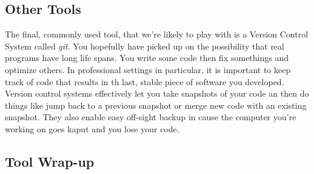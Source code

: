 \documentclass[]{tufte-handout}
\begin{document}
\subsection{Other Tools}

The final, commonly used tool, that we're likely to play with is a Version Control System called \textit{git}. You hopefully have picked up on the possibility that real programs have long life spans.  You write some code then fix somethings and optimize others.  In professional settings in particular, it is important to keep track of code that results in th last, stable piece of software you developed.  Version control systems effectively let you take snapshots of your code an then do things like jump back to a previous snapshot or merge new code with an existing snapshot.  They also enable easy off-sight backup in cause the computer you're working on goes kaput and you lose your code.

\subsection{Tool Wrap-up}
\end{document}
